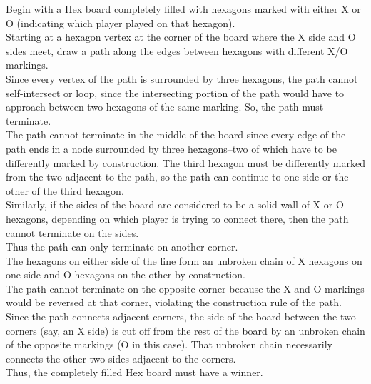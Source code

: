 \documentclass[12pt]{article}
\begin{document}
\newpage

    Begin with a Hex board completely filled with hexagons marked with either X or O (indicating which player played on that hexagon).\\
    Starting at a hexagon vertex at the corner of the board where the X side and O sides meet, draw a path along the edges between hexagons with different X/O markings.\\
    Since every vertex of the path is surrounded by three hexagons, the path cannot self-intersect or loop, since the intersecting portion of the path would have to approach between two hexagons of the same marking. So, the path must terminate.\\
    The path cannot terminate in the middle of the board since every edge of the path ends in a node surrounded by three hexagons--two of which have to be differently marked by construction. The third hexagon must be differently marked from the two adjacent to the path, so the path can continue to one side or the other of the third hexagon.\\
    Similarly, if the sides of the board are considered to be a solid wall of X or O hexagons, depending on which player is trying to connect there, then the path cannot terminate on the sides.\\
    Thus the path can only terminate on another corner.\\
    The hexagons on either side of the line form an unbroken chain of X hexagons on one side and O hexagons on the other by construction.\\
    The path cannot terminate on the opposite corner because the X and O markings would be reversed at that corner, violating the construction rule of the path.\\
    Since the path connects adjacent corners, the side of the board between the two corners (say, an X side) is cut off from the rest of the board by an unbroken chain of the opposite markings (O in this case). That unbroken chain necessarily connects the other two sides adjacent to the corners.\\
    Thus, the completely filled Hex board must have a winner.

 \newpage
\end{document}
